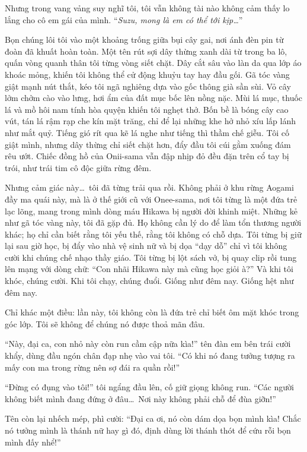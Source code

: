 \documentclass[../main.tex]{subfiles}
\begin{document}
Nhưng trong vang vảng suy nghĩ tôi, tôi vẫn không tài nào không cảm thấy lo lắng cho cô em gái của mình. ``\textit{Suzu, mong là em có thể tới kịp\dots}''


Bọn chúng lôi tôi vào một khoảng trống giữa bụi cây gai, nơi ánh đèn pin từ đoàn đã khuất hoàn toàn. Một tên rút sợi dây thừng xanh dài từ trong ba lô, quấn vòng quanh thân tôi từng vòng siết chặt. Dây cắt sâu vào làn da qua lớp áo khoác mỏng, khiến tôi không thể cử động khuỷu tay hay đầu gối. Gã tóc vàng giật mạnh nút thắt, kéo tôi ngã nghiêng dựa vào gốc thông già sần sùi. Vỏ cây lởm chởm cào vào lưng, hơi ẩm của đất mục bốc lên nồng nặc. Mùi lá mục, thuốc lá và mồ hôi nam tính hòa quyện khiến tôi nghẹt thở. Bốn bề là bóng cây cao vút, tán lá rậm rạp che kín mặt trăng, chỉ để lại những khe hở nhỏ xíu lấp lánh như mắt quỷ. Tiếng gió rít qua kẽ lá nghe như tiếng thì thầm chế giễu. Tôi cố giật mình, nhưng dây thừng chỉ siết chặt hơn, đẩy đầu tôi cúi gằm xuống đám rêu ướt. Chiếc đồng hồ của Onii-sama vẫn đập nhịp đỏ đều đặn trên cổ tay bị trói, như trái tim cô độc giữa rừng đêm.

Nhưng cảm giác này\dots\ tôi đã từng trải qua rồi. Không phải ở khu rừng Aogami đầy ma quái này, mà là ở thế giới cũ với Onee-sama, nơi tôi từng là một đứa trẻ lạc lõng, mang trong mình dòng máu Hikawa bị người đời khinh miệt. Những kẻ như gã tóc vàng này, tôi đã gặp đủ. Họ không cần lý do để làm tổn thương người khác; họ chỉ cần biết rằng tôi yếu thế, rằng tôi không có chỗ dựa. Tôi từng bị giữ lại sau giờ học, bị đẩy vào nhà vệ sinh nữ và bị dọa ``dạy dỗ'' chỉ vì tôi không cười khi chúng chế nhạo thầy giáo. Tôi từng bị lột sách vở, bị quay clip rồi tung lên mạng với dòng chữ: ``Con nhãi Hikawa này mà cũng học giỏi à?'' Và khi tôi khóc, chúng cười. Khi tôi chạy, chúng đuổi. Giống như đêm nay. Giống hệt như đêm nay.

Chỉ khác một điều: lần này, tôi không còn là đứa trẻ chỉ biết ôm mặt khóc trong góc lớp. Tôi sẽ không để chúng nó được thoả mãn đâu.

``Này, đại ca, con nhỏ này còn run cầm cập nữa kìa!'' tên đàn em bên trái cười khẩy, dùng đầu ngón chân đạp nhẹ vào vai tôi. ``Có khi nó đang tưởng tượng ra mấy con ma trong rừng nên sợ đái ra quần rồi!''

``Đừng có đụng vào tôi!'' tôi ngẩng đầu lên, cố giữ giọng không run. ``Các người không biết mình đang đứng ở đâu\dots\ Nơi này không phải chỗ để đùa giỡn!''

Tên còn lại nhếch mép, phì cười: ``Đại ca ơi, nó còn dám dọa bọn mình kìa! Chắc nó tưởng mình là thánh nữ hay gì đó, định dùng lời thánh thót để cứu rỗi bọn mình đấy nhể!''
\end{document}
